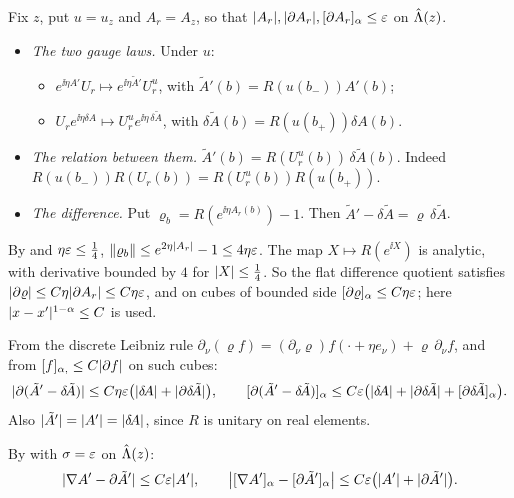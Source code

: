 \begin{detail}
\begin{step}
Fix $z$, put $u=u_z$ and $A_r=A_z$, so that $\lvert A_r\rvert,\lvert\partial A_r\rvert,[\partial A_r]_\alpha\le\varepsilon$ on $\hat{\Lambda}(z)$.
\begin{itemize}
\item \emph{The two gauge laws.} Under $u$:
  \begin{itemize}
  \item $e^{\ii\eta A'}U_r\mapsto e^{\ii\eta\tilde A'}U_r^u$, with $\tilde A'(b)=R(u(b_-))A'(b)$;
  \item $U_re^{\ii\eta\delta\!A}\mapsto U_r^ue^{\ii\eta\,\delta\!\tilde A}$, with $\delta\!\tilde A(b)=R(u(b_+))\delta\!A(b)$.
  \end{itemize}
\item \emph{The relation between them.} $\tilde A'(b)=R(U_r^u(b))\,\delta\!\tilde A(b)$. Indeed $R(u(b_-))R(U_r(b))=R(U_r^u(b))R(u(b_+))$.
\item \emph{The difference.} Put $\varrho_b=R(e^{\ii\eta A_r(b)})-1$. Then $\tilde A'-\delta\!\tilde A=\varrho\,\delta\!\tilde A$.
\end{itemize}
By  and $\eta\varepsilon\le\frac14$, $\lVert\varrho_b\rVert\le e^{2\eta\lvert A_r\rvert}-1\le4\eta\varepsilon$. The map $X\mapsto R(e^{\ii X})$ is analytic, with derivative bounded by $4$ for $\lvert X\rvert\le\frac14$. So the flat difference quotient satisfies $\lvert\partial\varrho\rvert\le C\eta\lvert\partial A_r\rvert\le C\eta\varepsilon$, and on cubes of bounded side $[\partial\varrho]_\alpha\le C\eta\varepsilon$; here $\lvert x-x'\rvert^{1-\alpha}\le C$ is used.

From the discrete Leibniz rule $\partial_\nu(\varrho f)=(\partial_\nu\varrho)f(\cdot+\eta e_\nu)+\varrho\,\partial_\nu f$, and from $[f]_{\alpha,}\le C\lvert\partial f\rvert$ on such cubes:
\[
\lvert\partial(\tilde A'-\delta\!\tilde A)\rvert\le C\eta\varepsilon\big(\lvert\delta\!A\rvert+\lvert\partial\delta\!\tilde A\rvert\big),\qquad[\partial(\tilde A'-\delta\!\tilde A)]_\alpha\le C\varepsilon\big(\lvert\delta\!A\rvert+\lvert\partial\delta\!\tilde A\rvert+[\partial\delta\!\tilde A]_\alpha\big).
\]
Also $\lvert\tilde A'\rvert=\lvert A'\rvert=\lvert\delta\!A\rvert$, since $R$ is unitary on real elements.
\end{step}

\begin{step}
By  with $\sigma=\varepsilon$ on $\hat{\Lambda}(z)$:
\[
\lvert\nabla A'-\partial\tilde A'\rvert\le C\varepsilon\lvert A'\rvert,\qquad\big|[\nabla A']_\alpha-[\partial\tilde A']_\alpha\big|\le C\varepsilon\big(\lvert A'\rvert+\lvert\partial\tilde A'\rvert\big).
\]
\end{step}


\end{detail}
